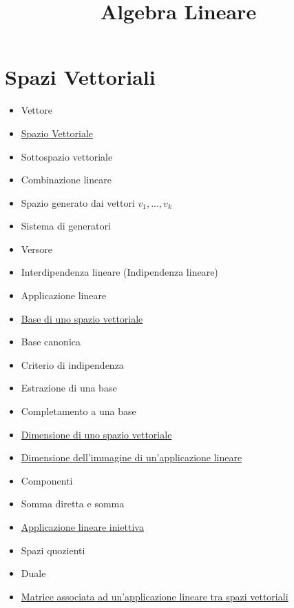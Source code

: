 \documentclass[a4paper,10pt]{article}
\title{Algebra Lineare}
\begin{document}
\maketitle

\section{Spazi Vettoriali}
\begin{itemize}
 \item Vettore
 \item \href{SpazioVettoriale.html}{Spazio Vettoriale}
 \item Sottospazio vettoriale
 \item Combinazione lineare
 \item Spazio generato dai vettori $v_1, ..., v_k$
 \item Sistema di generatori
 \item Versore
 \item Interdipendenza lineare (Indipendenza lineare)
 \item Applicazione lineare
 \item \href{Base.html}{Base di uno spazio vettoriale}
 \item Base canonica
 \item Criterio di indipendenza
 \item Estrazione di una base
 \item Completamento a una base
 \item \href{Dimensione.html}{Dimensione di uno spazio vettoriale}
 \item \href{DimensioneImmagine.html}{Dimensione dell'immagine di un'applicazione lineare}
 \item Componenti
 \item Somma diretta e somma 
 \item \href{ApplicazioneIniettiva.html}{Applicazione lineare iniettiva} 
 \item Spazi quozienti
 \item Duale
 \item \href{MatriceApplicazione.html}{Matrice associata ad un'applicazione lineare tra spazi vettoriali}
\end{itemize}
\end{document}
